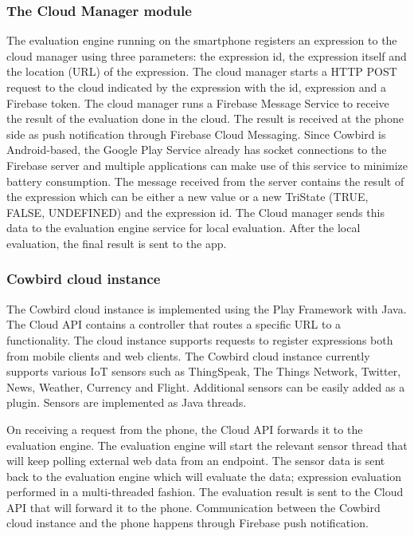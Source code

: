 \subsubsection{The Cloud Manager module}
The evaluation engine running on the smartphone registers an expression to the cloud manager using three parameters: the expression id, the expression itself and the location (URL) of the expression. The cloud manager starts a HTTP POST request to the cloud indicated by the expression with the id, expression and a Firebase token. The cloud manager runs a Firebase Message Service to receive the result of the evaluation done in the cloud. The result is received at the phone side as push notification through Firebase Cloud Messaging. 
Since Cowbird is Android-based, the Google Play Service already has socket connections to the Firebase server and multiple applications can make use of this service to minimize battery consumption. The message received from the server contains the result of the expression which can be either a new value or a new TriState (TRUE, FALSE, UNDEFINED) and the expression id. The Cloud manager sends this data to the evaluation engine service for local evaluation. After the local evaluation, the final result is sent to the app.
\subsubsection{Cowbird cloud instance}
The Cowbird cloud instance is implemented using the Play Framework \cite{playframeworkonline} with Java. The Cloud API contains a controller that routes a specific URL to a functionality. The cloud instance supports requests to register expressions both from mobile clients and web clients. The Cowbird cloud instance currently supports various IoT sensors such as ThingSpeak, The Things Network, Twitter, News, Weather, Currency and Flight. Additional sensors can be easily added as a plugin. Sensors are implemented as Java threads.

On receiving a request from the phone, the Cloud API forwards it to the evaluation engine. The evaluation engine will start the relevant sensor thread that will keep polling external web data from an endpoint. The sensor data is sent back to the evaluation engine which will evaluate the data;  expression evaluation performed in a multi-threaded fashion. The evaluation result is sent to the Cloud API that will forward it to the phone.
Communication between the Cowbird cloud instance and the phone happens through Firebase push notification.
